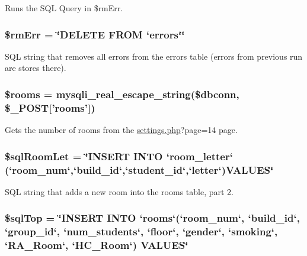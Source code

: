 \-Runs the \-S\-Q\-L \-Query in \$rm\-Err. \hypertarget{roomsVal_8php_aa1d0fd452ef88c3f247e457ae5d04157}{
\subsubsection[{\$rm\-Err}]{\setlength{\rightskip}{0pt plus 5cm}\$rm\-Err = \char`\"{}\-D\-E\-L\-E\-T\-E \-F\-R\-O\-M `errors`\char`\"{}}}\label{roomsVal_8php_aa1d0fd452ef88c3f247e457ae5d04157}
\-S\-Q\-L string that removes all errors from the errors table (errors from previous run are stores there). \hypertarget{roomsVal_8php_a7885060478f8025f87d356f715f7b776}{
\subsubsection[{\$rooms}]{\setlength{\rightskip}{0pt plus 5cm}\$rooms = mysqli\-\_\-real\-\_\-escape\-\_\-string(\$dbconn, \$\-\_\-\-P\-O\-S\-T\mbox{[}'rooms'\mbox{]})}}\label{roomsVal_8php_a7885060478f8025f87d356f715f7b776}
\-Gets the number of rooms from the \hyperlink{settings_8php}{settings.\-php}?page=14 page. \hypertarget{roomsVal_8php_afcbf90f700af2e9cb340e31593985d6e}{
\subsubsection[{\$sql\-Room\-Let}]{\setlength{\rightskip}{0pt plus 5cm}\$sql\-Room\-Let = \char`\"{}\-I\-N\-S\-E\-R\-T \-I\-N\-T\-O `room\-\_\-letter` (`room\-\_\-num`,`build\-\_\-id`,`student\-\_\-id`,`letter`)\-V\-A\-L\-U\-E\-S\char`\"{}}}\label{roomsVal_8php_afcbf90f700af2e9cb340e31593985d6e}
\-S\-Q\-L string that adds a new room into the rooms table, part 2. \hypertarget{roomsVal_8php_a1ed0735728ed423fcc71363224bf1b96}{
\subsubsection[{\$sql\-Top}]{\setlength{\rightskip}{0pt plus 5cm}\$sql\-Top = \char`\"{}\-I\-N\-S\-E\-R\-T \-I\-N\-T\-O `rooms`(`room\-\_\-num`, `build\-\_\-id`, `group\-\_\-id`, `num\-\_\-students`, `floor`, `gender`, `smoking`, `\-R\-A\-\_\-\-Room`, `\-H\-C\-\_\-\-Room`) \-V\-A\-L\-U\-E\-S\char`\"{}}}\label{roomsVal_8php_a1ed0735728ed423fcc71363224bf1b96}
